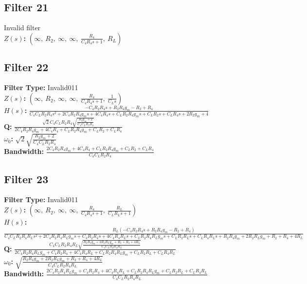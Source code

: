 \documentclass{article}
\begin{document}
\subsection*{Filter 21}
Invalid filter \\ 
\textbf{$Z(s)$:} $\left( \infty, \  R_{2}, \  \infty, \  \infty, \  \frac{R_{4}}{C_{4} R_{4} s + 1}, \  R_{L}\right)$ \\ 
\subsection*{Filter 22}
\textbf{Filter Type:} Invalid011 \\ 
\textbf{$Z(s)$:} $\left( \infty, \  R_{2}, \  \infty, \  \infty, \  \frac{R_{4}}{C_{4} R_{4} s + 1}, \  \frac{1}{C_{L} s}\right)$ \\ 
\textbf{$H(s)$:} $\frac{- C_{4} R_{2} R_{4} s + R_{2} R_{4} g_{m} - R_{2} + R_{4}}{C_{4} C_{L} R_{2} R_{4} s^{2} + 2 C_{4} R_{2} R_{4} g_{m} s + 4 C_{4} R_{4} s + C_{L} R_{2} R_{4} g_{m} s + C_{L} R_{2} s + C_{L} R_{4} s + 2 R_{2} g_{m} + 4}$ \\ 
\textbf{Q:} $\frac{\sqrt{2} C_{4} C_{L} R_{2} R_{4} \sqrt{\frac{R_{2} g_{m} + 2}{C_{4} C_{L} R_{2} R_{4}}}}{2 C_{4} R_{2} R_{4} g_{m} + 4 C_{4} R_{4} + C_{L} R_{2} R_{4} g_{m} + C_{L} R_{2} + C_{L} R_{4}}$ \\ 
\textbf{$\omega_0$:} $\sqrt{2} \sqrt{\frac{R_{2} g_{m} + 2}{C_{4} C_{L} R_{2} R_{4}}}$ \\ 
\textbf{Bandwidth:} $\frac{2 C_{4} R_{2} R_{4} g_{m} + 4 C_{4} R_{4} + C_{L} R_{2} R_{4} g_{m} + C_{L} R_{2} + C_{L} R_{4}}{C_{4} C_{L} R_{2} R_{4}}$ \\ 
\subsection*{Filter 23}
\textbf{Filter Type:} Invalid011 \\ 
\textbf{$Z(s)$:} $\left( \infty, \  R_{2}, \  \infty, \  \infty, \  \frac{R_{4}}{C_{4} R_{4} s + 1}, \  \frac{R_{L}}{C_{L} R_{L} s + 1}\right)$ \\ 
\textbf{$H(s)$:} $\frac{R_{L} \left(- C_{4} R_{2} R_{4} s + R_{2} R_{4} g_{m} - R_{2} + R_{4}\right)}{C_{4} C_{L} R_{2} R_{4} R_{L} s^{2} + 2 C_{4} R_{2} R_{4} R_{L} g_{m} s + C_{4} R_{2} R_{4} s + 4 C_{4} R_{4} R_{L} s + C_{L} R_{2} R_{4} R_{L} g_{m} s + C_{L} R_{2} R_{L} s + C_{L} R_{4} R_{L} s + R_{2} R_{4} g_{m} + 2 R_{2} R_{L} g_{m} + R_{2} + R_{4} + 4 R_{L}}$ \\ 
\textbf{Q:} $\frac{C_{4} C_{L} R_{2} R_{4} R_{L} \sqrt{\frac{R_{2} R_{4} g_{m} + 2 R_{2} R_{L} g_{m} + R_{2} + R_{4} + 4 R_{L}}{C_{4} C_{L} R_{2} R_{4} R_{L}}}}{2 C_{4} R_{2} R_{4} R_{L} g_{m} + C_{4} R_{2} R_{4} + 4 C_{4} R_{4} R_{L} + C_{L} R_{2} R_{4} R_{L} g_{m} + C_{L} R_{2} R_{L} + C_{L} R_{4} R_{L}}$ \\ 
\textbf{$\omega_0$:} $\sqrt{\frac{R_{2} R_{4} g_{m} + 2 R_{2} R_{L} g_{m} + R_{2} + R_{4} + 4 R_{L}}{C_{4} C_{L} R_{2} R_{4} R_{L}}}$ \\ 
\textbf{Bandwidth:} $\frac{2 C_{4} R_{2} R_{4} R_{L} g_{m} + C_{4} R_{2} R_{4} + 4 C_{4} R_{4} R_{L} + C_{L} R_{2} R_{4} R_{L} g_{m} + C_{L} R_{2} R_{L} + C_{L} R_{4} R_{L}}{C_{4} C_{L} R_{2} R_{4} R_{L}}$ \\ 
\end{document}
